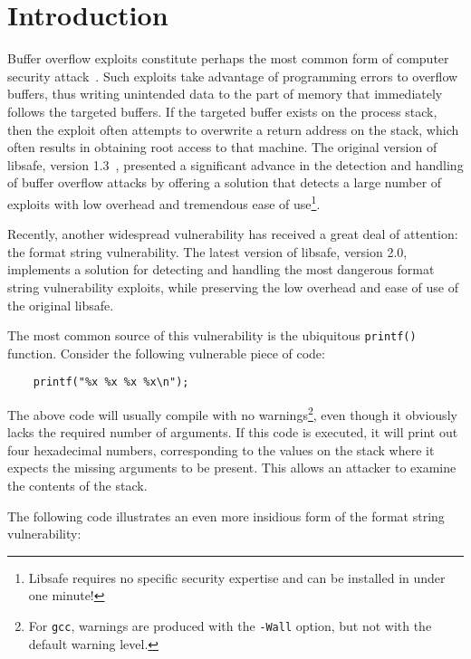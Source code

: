 \documentclass[]{article}
\begin{document}

\section{Introduction}
\label{sec:introduction}

Buffer overflow exploits constitute perhaps the most common form of computer
security attack~\cite{SSP89*326,Rochlis89,Seeley89}.  Such exploits take
advantage of programming errors to overflow buffers, thus writing unintended
data to the part of memory that immediately follows the targeted buffers.  If
the targeted buffer exists on the process stack, then the exploit often
attempts to overwrite a return address on the stack, which often results in
obtaining root access to that machine.  The original version of libsafe,
version 1.3~\cite{usenix}, presented a significant advance in the detection and
handling of buffer overflow attacks by offering a solution that detects a large
number of exploits with low overhead and tremendous ease of
use\footnote{Libsafe requires no specific security expertise and can be
installed in under one minute!}.

Recently, another widespread vulnerability has received a great deal of
attention:  the format string vulnerability\cite{bind_report,wuftpd_report}.
The latest version of libsafe, version 2.0, implements a solution for detecting
and handling the most dangerous format string vulnerability exploits, while
preserving the low overhead and ease of use of the original libsafe.

The most common source of this vulnerability is the ubiquitous {\tt printf()}
function.  Consider the following vulnerable piece of code:

\begin{verbatim}
    printf("%x %x %x %x\n");
\end{verbatim}

The above code will usually compile with no warnings\footnote{For {\tt gcc},
warnings are produced with the {\tt -Wall} option, but not with the default
warning level.}, even though it obviously lacks the required number of
arguments.  If this code is executed, it will print out four hexadecimal
numbers, corresponding to the values on the stack where it expects the missing
arguments to be present.  This allows an attacker to examine the contents of
the stack.

The following code illustrates an even more insidious form of the format string
vulnerability:
\end{document}
